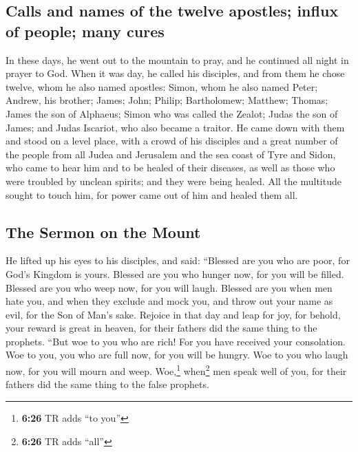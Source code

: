 \hypertarget{calls-and-names-of-the-twelve-apostles-influx-of-people-many-cures}{%
\subsection{Calls and names of the twelve apostles; influx of people;
many
cures}\label{calls-and-names-of-the-twelve-apostles-influx-of-people-many-cures}}

 In these days, he went out to the mountain to pray, and
he continued all night in prayer to God.  When it was
day, he called his disciples, and from them he chose twelve, whom he
also named apostles:  Simon, whom he also named Peter;
Andrew, his brother; James; John; Philip; Bartholomew; 
Matthew; Thomas; James the son of Alphaeus; Simon who was called the
Zealot;  Judas the son of James; and Judas Iscariot, who
also became a traitor.  He came down with them and stood
on a level place, with a crowd of his disciples and a great number of
the people from all Judea and Jerusalem and the sea coast of Tyre and
Sidon, who came to hear him and to be healed of their diseases,
 as well as those who were troubled by unclean spirits;
and they were being healed.  All the multitude sought to
touch him, for power came out of him and healed them all.

\hypertarget{the-sermon-on-the-mount}{%
\subsection{The Sermon on the Mount}\label{the-sermon-on-the-mount}}

 He lifted up his eyes to his disciples, and said:
``Blessed are you who are poor, for God's Kingdom is yours.
 Blessed are you who hunger now, for you will be filled.
Blessed are you who weep now, for you will laugh. 
Blessed are you when men hate you, and when they exclude and mock you,
and throw out your name as evil, for the Son of Man's sake.
 Rejoice in that day and leap for joy, for behold, your
reward is great in heaven, for their fathers did the same thing to the
prophets.  ``But woe to you who are rich! For you have
received your consolation.  Woe to you, you who are full
now, for you will be hungry. Woe to you who laugh now, for you will
mourn and weep.  Woe,\footnote{\textbf{6:26} TR adds ``to
  you''} when\footnote{\textbf{6:26} TR adds ``all''} men speak well of
you, for their fathers did the same thing to the false prophets.

